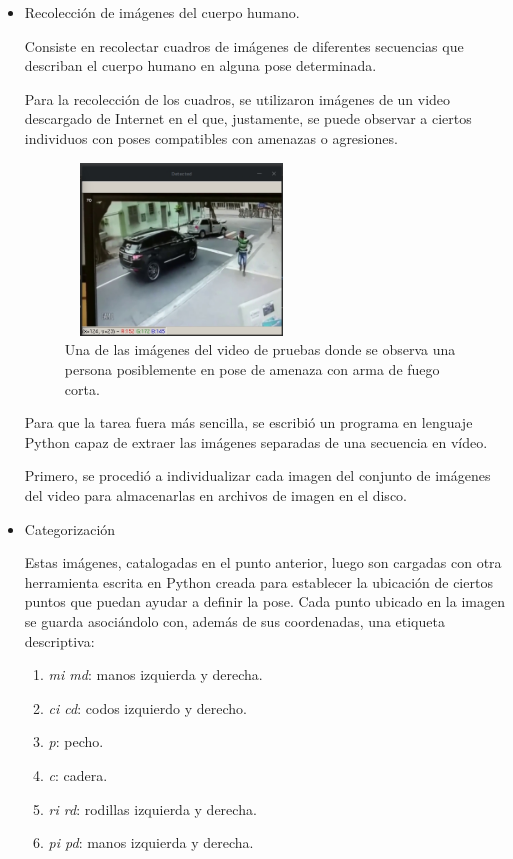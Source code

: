 \documentclass[a4paper,12pt,oneside,spanish]{book}
\begin{document}
\begin{itemize}
	\item Recolección de imágenes del cuerpo humano.

	Consiste en recolectar cuadros de imágenes de diferentes secuencias que describan el cuerpo humano en alguna pose determinada.\par 
	
	Para la recolección de los cuadros, se utilizaron imágenes de un video descargado de Internet en el que, justamente, se puede observar a ciertos individuos con poses compatibles con amenazas o agresiones.\par 
	
	\begin{figure}[h!]
		\includegraphics[width=175pt,height=130pt]{Imagenes/video1.jpg}
		\centering
		\caption{Una de las imágenes del video de pruebas donde se observa una persona posiblemente en pose de amenaza con arma de fuego corta.}
		\label{fig:video1}
	\end{figure}
	
	Para que la tarea fuera más sencilla, se escribió un programa en lenguaje Python capaz de extraer las imágenes separadas de una secuencia en vídeo.\par 
	
	Primero, se procedió a individualizar cada imagen del conjunto de imágenes del video para almacenarlas en archivos de imagen en el disco.\par 

\item{Categorización}\par

	Estas imágenes, catalogadas en el punto anterior, luego son cargadas con otra herramienta escrita en Python creada para establecer la ubicación de ciertos puntos que puedan ayudar a definir la pose. Cada punto ubicado en la imagen se guarda asociándolo con, además de sus coordenadas, una etiqueta descriptiva:
	\begin{enumerate}
		\item \textit{mi md}: manos izquierda y derecha.
		\item \textit{ci cd}: codos izquierdo y derecho.
		\item \textit{p}: pecho.
		\item \textit{c}: cadera.
		\item \textit{ri rd}: rodillas izquierda y derecha.
		\item \textit{pi pd}: manos izquierda y derecha.
	\end{enumerate}	
		

\end{itemize}
\end{document}
